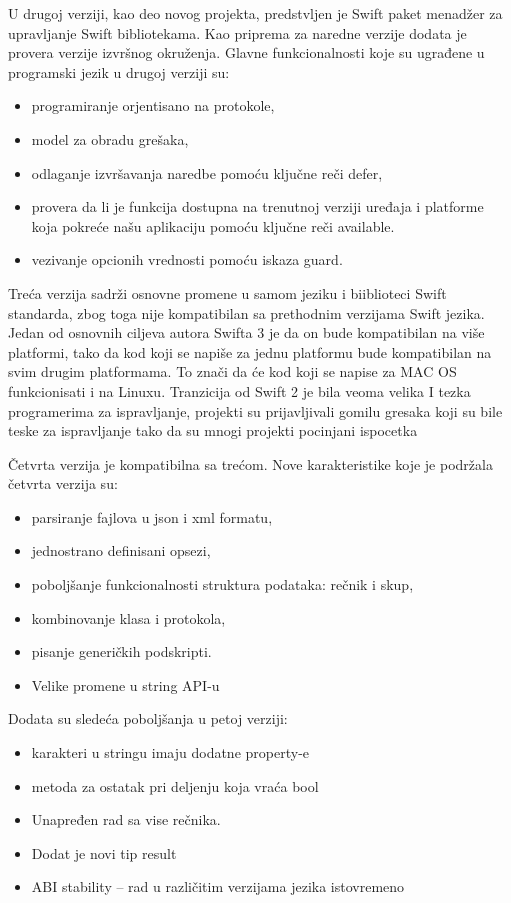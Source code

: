 \documentclass[a4paper]{article}
\begin{document}
U drugoj verziji, kao deo novog projekta, predstvljen je Swift paket menadžer za upravljanje Swift bibliotekama. Kao priprema za naredne verzije dodata je provera verzije izvršnog okruženja. Glavne funkcionalnosti koje su ugrađene u programski jezik u drugoj verziji su:
\begin{itemize}
\item programiranje orjentisano na protokole,
\item model za obradu grešaka,
\item odlaganje izvršavanja naredbe pomoću ključne reči defer,
\item provera da li je funkcija dostupna na trenutnoj verziji uređaja i platforme koja pokreće našu aplikaciju pomoću ključne reči available.
\item vezivanje opcionih  vrednosti pomoću iskaza guard. 
\end{itemize}



Treća verzija sadrži osnovne promene u samom jeziku i biiblioteci Swift standarda, zbog toga nije kompatibilan sa prethodnim verzijama Swift jezika. Jedan od osnovnih ciljeva autora Swifta 3 je da on bude kompatibilan na više platformi, tako da kod koji se napiše za jednu platformu bude kompatibilan na svim drugim platformama. To znači da će kod koji se napise za MAC OS funkcionisati i na Linuxu. Tranzicija od Swift 2 je bila veoma velika I tezka programerima za ispravljanje, projekti su prijavljivali gomilu gresaka koji su bile teske za ispravljanje tako da su mnogi projekti pocinjani ispocetka



Četvrta verzija je kompatibilna sa trećom. Nove karakteristike koje je podržala četvrta verzija su:
\begin{itemize}
\item parsiranje fajlova u json i xml formatu,
\item jednostrano definisani opsezi,
\item poboljšanje funkcionalnosti struktura podataka: rečnik i skup,
\item kombinovanje klasa i protokola,
\item pisanje generičkih podskripti.
\item Velike promene  u string API-u
\end{itemize}


Dodata su sledeća poboljšanja u petoj verziji:
\begin{itemize}
\item karakteri u stringu imaju dodatne property-e
\item metoda za ostatak pri deljenju koja vraća bool
\item Unapređen rad sa vise rečnika.
\item Dodat je novi tip result 
\item ABI stability – rad u različitim verzijama jezika istovremeno
\end{itemize}
  
\end{document}
